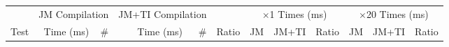 %
%

\begin{figure*}[ht]
\centering
\begin{tabular}{lrrrrrrrrrrr}

\toprule

           & \multicolumn{2}{c}{JM Compilation}
           & \multicolumn{2}{c}{JM+TI Compilation}
           & %
           & \multicolumn{3}{c}{$\times$1 Times (ms)}
           & \multicolumn{3}{c}{$\times$20 Times (ms)} \\

\cmidrule(r){2-3}
\cmidrule{4-5}
\cmidrule(r){7-9}
\cmidrule{10-12}

Test       & Time (ms) & \#
           & Time (ms) & \#
           & Ratio
           & JM
           & JM+TI
           & Ratio
           & JM
           & JM+TI
           & Ratio \\

\midrule


\end{tabular}
\end{figure*}
